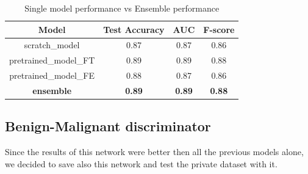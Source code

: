 \documentclass[11pt,a4paper,oneside]{article}
\begin{document}
\begin{table}[h]
\centering
	\begin{tabular}{|c|ccc|}
	\hline
	Model & Test Accuracy & AUC & F-score \\
	\hline
	scratch\_model 		  & 0.87 & 0.87 & 0.86 \\
	pretrained\_model\_FT & 0.89 & 0.89 & 0.88 \\
	pretrained\_model\_FE & 0.88 & 0.87 & 0.86 \\
	\textbf{ensemble}     & \textbf{0.89} & \textbf{0.89} & \textbf{0.88} \\
	\hline
	\end{tabular}
\caption{Single model performance vs Ensemble performance}
\label{tab:ensemble1}
\end{table}

\clearpage

\subsection{Benign-Malignant discriminator}
Since the results of this network were better then all the previous models alone, we decided to save also this network and test the private dataset with it.
\end{document}
